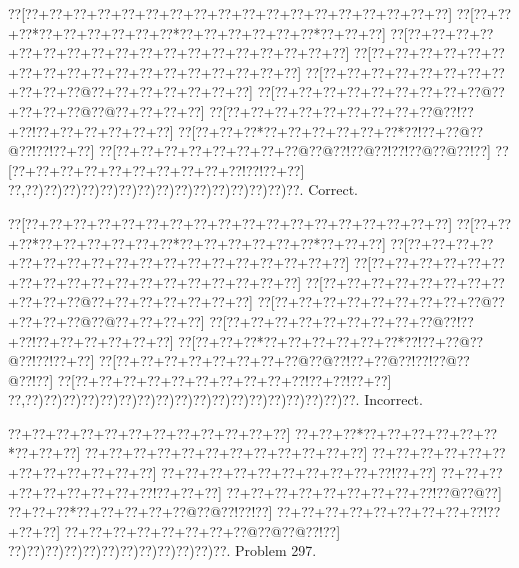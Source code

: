 \documentclass[a5paper]{article}
\begin{document}
\begin{center}
{\goo
\0??[\0??+\0??+\0??+\0??+\0??+\0??+\0??+\0??+\0??+\0??+\0??+\0??+\0??+\0??+\0??+\0??+\0??+\0??]
\0??[\0??+\0??+\0??*\0??+\0??+\0??+\0??+\0??+\0??*\0??+\0??+\0??+\0??+\0??+\0??*\0??+\0??+\0??]
\0??[\0??+\0??+\0??+\0??+\0??+\0??+\0??+\0??+\0??+\0??+\0??+\0??+\0??+\0??+\0??+\0??+\0??+\0??]
\0??[\0??+\0??+\0??+\0??+\0??+\0??+\0??+\0??+\0??+\0??+\0??+\0??+\0??+\0??+\0??+\0??+\0??+\0??]
\0??[\0??+\0??+\0??+\0??+\0??+\0??+\0??+\0??+\0??+\0??+\0??@\0??+\0??+\0??+\0??+\0??+\0??+\0??]
\0??[\0??+\0??+\0??+\0??+\0??+\0??+\0??+\0??+\0??@\0??+\0??+\0??+\0??@\0??@\0??+\0??+\0??+\0??]
\0??[\0??+\0??+\0??+\0??+\0??+\0??+\0??+\0??+\0??@\0??!\0??+\0??!\0??+\0??+\0??+\0??+\0??+\0??]
\0??[\0??+\0??+\0??*\0??+\0??+\0??+\0??+\0??+\0??*\0??!\0??+\0??@\0??@\0??!\0??!\0??+\0??]
\0??[\0??+\0??+\0??+\0??+\0??+\0??+\0??+\0??@\0??@\0??!\0??@\0??!\0??!\0??@\0??@\0??!\0??]
\0??[\0??+\0??+\0??+\0??+\0??+\0??+\0??+\0??+\0??+\0??!\0??!\0??+\0??]
\0??,\0??)\0??)\0??)\0??)\0??)\0??)\0??)\0??)\0??)\0??)\0??)\0??)\0??)\0??)\0??.
}
Correct. 

\end{center}
\begin{center}
{\goo
\0??[\0??+\0??+\0??+\0??+\0??+\0??+\0??+\0??+\0??+\0??+\0??+\0??+\0??+\0??+\0??+\0??+\0??+\0??]
\0??[\0??+\0??+\0??*\0??+\0??+\0??+\0??+\0??+\0??*\0??+\0??+\0??+\0??+\0??+\0??*\0??+\0??+\0??]
\0??[\0??+\0??+\0??+\0??+\0??+\0??+\0??+\0??+\0??+\0??+\0??+\0??+\0??+\0??+\0??+\0??+\0??+\0??]
\0??[\0??+\0??+\0??+\0??+\0??+\0??+\0??+\0??+\0??+\0??+\0??+\0??+\0??+\0??+\0??+\0??+\0??+\0??]
\0??[\0??+\0??+\0??+\0??+\0??+\0??+\0??+\0??+\0??+\0??+\0??@\0??+\0??+\0??+\0??+\0??+\0??+\0??]
\0??[\0??+\0??+\0??+\0??+\0??+\0??+\0??+\0??+\0??@\0??+\0??+\0??+\0??@\0??@\0??+\0??+\0??+\0??]
\0??[\0??+\0??+\0??+\0??+\0??+\0??+\0??+\0??+\0??@\0??!\0??+\0??!\0??+\0??+\0??+\0??+\0??+\0??]
\0??[\0??+\0??+\0??*\0??+\0??+\0??+\0??+\0??+\0??*\0??!\0??+\0??@\0??@\0??!\0??!\0??+\0??]
\0??[\0??+\0??+\0??+\0??+\0??+\0??+\0??+\0??@\0??@\0??!\0??+\0??@\0??!\0??!\0??@\0??@\0??!\0??]
\0??[\0??+\0??+\0??+\0??+\0??+\0??+\0??+\0??+\0??+\0??!\0??+\0??!\0??+\0??]
\0??,\0??)\0??)\0??)\0??)\0??)\0??)\0??)\0??)\0??)\0??)\0??)\0??)\0??)\0??)\0??)\0??)\0??)\0??.
}
Incorrect. 

\end{center}
\newpage
\begin{center}
{\goo
\0??+\0??+\0??+\0??+\0??+\0??+\0??+\0??+\0??+\0??+\0??+\0??]
\0??+\0??+\0??*\0??+\0??+\0??+\0??+\0??+\0??*\0??+\0??+\0??]
\0??+\0??+\0??+\0??+\0??+\0??+\0??+\0??+\0??+\0??+\0??+\0??]
\0??+\0??+\0??+\0??+\0??+\0??+\0??+\0??+\0??+\0??+\0??+\0??]
\0??+\0??+\0??+\0??+\0??+\0??+\0??+\0??+\0??+\0??!\0??+\0??]
\0??+\0??+\0??+\0??+\0??+\0??+\0??+\0??+\0??!\0??+\0??+\0??]
\0??+\0??+\0??+\0??+\0??+\0??+\0??+\0??+\0??!\0??@\0??@\0??]
\0??+\0??+\0??*\0??+\0??+\0??+\0??+\0??@\0??@\0??!\0??!\0??]
\0??+\0??+\0??+\0??+\0??+\0??+\0??+\0??+\0??!\0??+\0??+\0??]
\0??+\0??+\0??+\0??+\0??+\0??+\0??+\0??@\0??@\0??@\0??!\0??]
\0??)\0??)\0??)\0??)\0??)\0??)\0??)\0??)\0??)\0??)\0??)\0??.
}
Problem 297.

\end{center}
\end{document}
